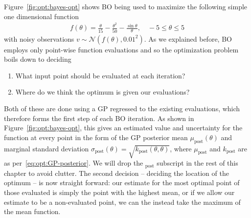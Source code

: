 Figure~\ref{fig:opt:bayes-opt} shows BO being used to maximize the 
following simple one dimensional function
\begin{align}
\label{eq:opt:toy}
f(\theta) = \frac{\theta}{15}-\frac{\theta^2}{50}-\frac{\sin \theta}{\theta}, \quad -5\le \theta \le 5
\end{align}
with noisy observations $v\sim\mathcal{N}(f(\theta),0.01^2)$.  As we
explained before, BO employs only point-wise function
evaluations and so the optimization problem boils down to deciding 
\begin{enumerate}
		\setlength\itemsep{0em}
	\item What input point should be evaluated at each iteration?
	\item Where do we think the optimum is given our evaluations?
\end{enumerate}
Both of these are done using a GP regressed to the existing evaluations,
which therefore forms the first step of each BO iteration.  As shown in
Figure~\ref{fig:opt:bayes-opt}, this gives an estimated value and uncertainty for the function
at every point in the form of the GP posterior mean $\mu_{\text{post}}(\theta)$ and 
marginal standard deviation $\sigma_{\text{post}}(\theta) = \sqrt{k_{\text{post}}(\theta,\theta)}$,
where $\mu_{\text{post}}$ and $k_{\text{post}}$ are as per~\eqref{eq:opt:GP-posterior}.  We will
drop the $_{\text{post}}$ subscript in the rest of this chapter to avoid clutter.
The second decision -- deciding the location of the optimum -- is now straight forward: our
estimate for the most optimal point of those evaluated is simply the point with
the highest mean, or if we allow our estimate to be a non-evaluated point, we can the instead take
the maximum of the mean function.

